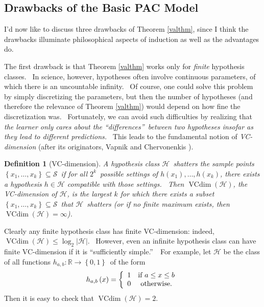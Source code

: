 \documentclass[11pt,onecolumn]{article}%
\newtheorem{definition}[theorem]{Definition}
\begin{document}
\subsection{Drawbacks of the Basic PAC Model\label{DRAWBACKS}}

I'd now like to discuss three drawbacks of Theorem \ref{valthm}, since I think
the drawbacks illuminate philosophical aspects of induction as well as the
advantages do.

The first drawback is that Theorem \ref{valthm} works only for \textit{finite}
hypothesis classes. \ In science, however, hypotheses often involve continuous
parameters, of which there is an uncountable infinity. \ Of course, one could
solve this problem by simply discretizing the parameters, but then the number
of hypotheses (and therefore the relevance of Theorem \ref{valthm}) would
depend on how fine the discretization was. \ Fortunately, we can avoid such
difficulties by realizing that \textit{the learner only cares about the
\textquotedblleft differences\textquotedblright\ between two hypotheses
insofar as they lead to different predictions.} \ This leads to the
fundamental notion of \textit{VC-dimension} (after its originators, Vapnik and
Chervonenkis \cite{vc}).

\begin{definition}
[VC-dimension]A hypothesis class $\mathcal{H}$\ shatters the sample points
$\left\{  x_{1},\ldots,x_{k}\right\}  \subseteq\mathcal{S}$\ if for all
$2^{k}$\ possible settings of $h\left(  x_{1}\right)  ,\ldots,h\left(
x_{k}\right)  $, there exists a hypothesis $h\in\mathcal{H}$ compatible with
those settings. \ Then $\operatorname*{VCdim}\left(  \mathcal{H}\right)  $,
the VC-dimension of $\mathcal{H}$, is the largest $k$ for which there exists a
subset $\left\{  x_{1},\ldots,x_{k}\right\}  \subseteq\mathcal{S}$\ that
$\mathcal{H}$\ shatters (or if no finite maximum exists, then
$\operatorname*{VCdim}\left(  \mathcal{H}\right)  =\infty$).
\end{definition}

Clearly any finite hypothesis class has finite VC-dimension: indeed,
$\operatorname*{VCdim}\left(  \mathcal{H}\right)  \leq\log_{2}\left\vert
\mathcal{H}\right\vert $. \ However, even an infinite hypothesis class can
have finite VC-dimension if it is \textquotedblleft sufficiently
simple.\textquotedblright\ \ For example, let $\mathcal{H}$ be the class of
all functions $h_{a,b}:\mathbb{R}\rightarrow\left\{  0,1\right\}  $\ of the
form%
\[
h_{a,b}\left(  x\right)  =\left\{
\begin{array}
[c]{cc}%
1 & \text{if }a\leq x\leq b\\
0 & \text{otherwise.}%
\end{array}
\right.
\]
Then it is easy to check that $\operatorname*{VCdim}\left(  \mathcal{H}%
\right)  =2$.
\end{document}

